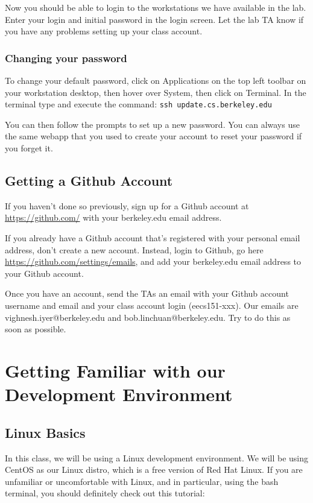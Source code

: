 \documentclass[11pt]{article}
\begin{document}
Now you should be able to login to the workstations we have available in the lab. Enter your login and initial password in the login screen. Let the lab TA know if you have any problems setting up your class account.

\subsubsection{Changing your password}
To change your default password, click on Applications on the top left toolbar on your workstation desktop, then hover over System, then click on Terminal. In the terminal type and execute the command: \verb|ssh update.cs.berkeley.edu|

You can then follow the prompts to set up a new password. You can always use the same webapp that you used to create your account to reset your password if you forget it.

\subsection{Getting a Github Account}
If you haven't done so previously, sign up for a Github account at \url{https://github.com/} with your berkeley.edu email address.

If you already have a Github account that's registered with your personal email address, don't create a new account. Instead, login to Github, go here \url{https://github.com/settings/emails}, and add your berkeley.edu email address to your Github account.

Once you have an account, send the TAs an email with your Github account username and email and your class account login (eecs151-xxx). Our emails are vighnesh.iyer@berkeley.edu and bob.linchuan@berkeley.edu. Try to do this as soon as possible.


\section{Getting Familiar with our Development Environment}
\subsection{Linux Basics}
In this class, we will be using a Linux development environment. We will be using CentOS as our Linux distro, which is a free version of Red Hat Linux. If you are unfamiliar or uncomfortable with Linux, and in particular, using the bash terminal, you should definitely check out this tutorial:
\end{document}
